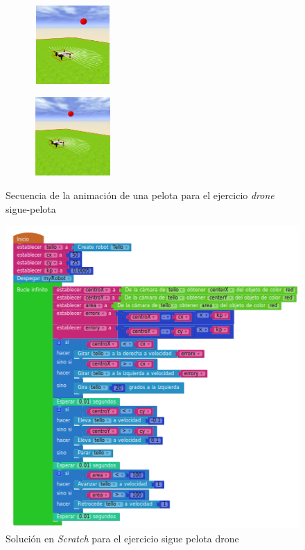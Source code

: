\begin{figure}[H]
\begin{subfigure}[t]{0.2\textwidth}
\label{fig:figure2_10}
\end{subfigure}\hfill
\begin{subfigure}[t]{0.2\textwidth}
    \includegraphics[width=3cm, height=3cm]{img/followBallTello11.png}
\label{fig:figure2_11}
\end{subfigure}\hfill
\begin{subfigure}[t]{0.2\textwidth}
    \includegraphics[width=3cm, height=3cm]{img/followBallTello12.png}
\label{fig:figure2_12}
\end{subfigure}
\caption{Secuencia de la animación de una pelota para el ejercicio \textit{drone} sigue-pelota}
\label{fig:secuenciaDrone}
\end{figure}

    \begin{figure}[H]
    \centering
    \includegraphics[scale=0.5]{img/siguepelotacodigo.png}
    \caption{Solución en \textit{Scratch} para el ejercicio sigue pelota drone} 
    \label{fig:pelotaSolution}
    \end{figure}
    
